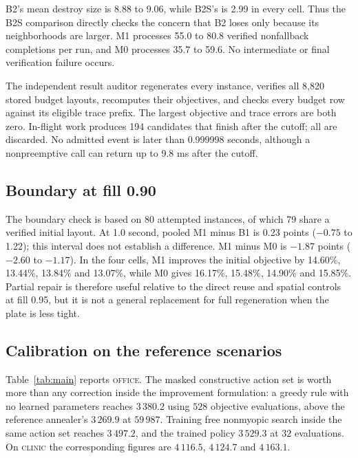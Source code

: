 \documentclass[preprint,12pt,authoryear]{elsarticle}
\newif\iflegacydetails
\begin{document}
B2's mean destroy size is 8.88 to 9.06, while B2S's is 2.99 in every cell.
Thus the B2S comparison directly checks the concern that B2 loses only because
its neighborhoods are larger. M1 processes 55.0 to 80.8 verified nonfallback
completions per run, and M0 processes 35.7 to 59.6. No intermediate or final
verification failure occurs.

The independent result auditor regenerates every instance, verifies all 8,820
stored budget layouts, recomputes their objectives, and checks every budget row
against its eligible trace prefix. The largest objective and trace errors are
both zero. In-flight work produces 194 candidates that finish after the cutoff;
all are discarded. No admitted event is later than 0.999998 seconds, although a
nonpreemptive call can return up to 9.8 ms after the cutoff.

\subsection{Boundary at fill 0.90}
The boundary check is based on 80 attempted instances, of which 79 share a
verified initial layout. At 1.0 second, pooled M1 minus B1 is 0.23 points
($-0.75$ to 1.22); this interval does not establish a difference. M1 minus M0
is $-1.87$ points ($-2.60$ to $-1.17$). In the four cells, M1 improves the
initial objective by 14.60\%, 13.44\%, 13.84\% and 13.07\%, while M0 gives
16.17\%, 15.48\%, 14.90\% and 15.85\%. Partial repair is therefore useful
relative to the direct reuse and spatial controls at fill 0.95, but it is not a
general replacement for full regeneration when the plate is less tight.

\iflegacydetails
\subsection{Calibration on the reference scenarios}
\label{sec:results_scenarios}
Table~\ref{tab:main} reports \textsc{office}. The masked constructive action set
is worth more than any correction inside the improvement formulation: a greedy
rule with no learned parameters reaches $3\,380.2$ using $528$ objective
evaluations, above the reference annealer's $3\,269.9$ at $59\,987$. Training free
nonmyopic search inside the same action set reaches $3\,497.2$, and the trained
policy $3\,529.3$ at $32$ evaluations. On \textsc{clinic} the corresponding
figures are $4\,116.5$, $4\,124.7$ and $4\,163.1$.
\end{document}
